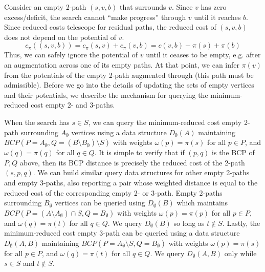 \documentclass[11pt]{article}
\theoremstyle{plain}
\begin{document}
Consider an empty 2-path $(s, v, b)$ that surrounds $v$.
Since $v$ has zero excess/deficit, the search cannot ``make progress'' through
$v$ until it reaches $b$.
Since reduced costs telescope for residual paths, the reduced cost of
$(s, v, b)$ does not depend on the potential of $v$.
\begin{equation*}
	c_\pi((s, v, b)) = c_\pi(s, v) + c_\pi(v, b) = c(v, b) - \pi(s) + \pi(b)
\end{equation*}
Thus, we can safely ignore the potential of $v$ until it ceases to be
empty, e.g. after an augmentation across one of its empty paths.
At that point, we can infer $\pi(v)$ from the potentials of the empty 2-path
augmented through (this path must be admissible).
Before we go into the details of updating the sets of empty vertices and their
potentials, we describe the mechanism for querying the minimum-reduced cost
empty 2- and 3-paths.

When the search has $s \in S$, we can query the minimum-reduced cost empty
2-path surrounding $A_\emptyset$ vertices using a data structure
$D_\emptyset(A)$ maintaining
$BCP(P = A_\emptyset, Q = (B \setminus B_\emptyset) \setminus S)$ with weights
$\omega(p) = \pi(s)$ for all $p \in P$, and $\omega(q) = \pi(q)$ for all
$q \in Q$.
It is simple to verify that if $(p, q)$ is the BCP of $P, Q$ above, then its
BCP distance is precisely the reduced cost of the 2-path $(s, p, q)$.
We can build similar query data structures for other empty 2-paths and empty
3-paths, also reporting a pair whose weighted distance is equal to the reduced
cost of the corresponding empty 2- or 3-path.
Empty 2-paths surrounding $B_\emptyset$ vertices can be queried using
$D_\emptyset(B)$ which maintains
$BCP(P = (A \setminus A_\emptyset) \cap S, Q = B_\emptyset)$ with weights
$\omega(p) = \pi(p)$ for all $p \in P$, and $\omega(q) = \pi(t)$ for all
$q \in Q$.
We query $D_\emptyset(B)$ so long as $t \not\in S$.
Lastly, the minimum-reduced cost empty 3-path can be queried using a data
structure $D_\emptyset(A, B)$ maintaining
$BCP(P = A_\emptyset \setminus S, Q = B_\emptyset)$ with weights
$\omega(p) = \pi(s)$ for all $p \in P$, and $\omega(q) = \pi(t)$ for all
$q \in Q$.
We query $D_\emptyset(A, B)$ only while $s \in S$ and $t \not\in S$.

\end{document}
